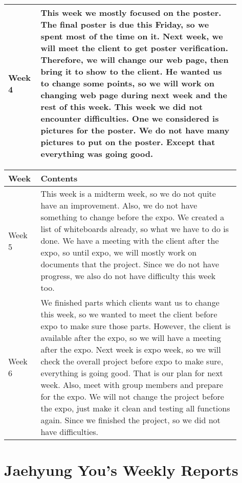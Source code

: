 \documentclass[10pt]{article}
\begin{document}
\begin{center}
\begin{tabular}{ | p{0.1\linewidth} | p{0.8\linewidth} | }
            Week 4 & This week we mostly focused on the poster. The final poster is due this Friday, so we spent most of the time on it. Next week, we will meet the client to get poster verification. Therefore, we will change our web page, then bring it to show to the client. He wanted us to change some points, so we will work on changing web page during next week and the rest of this week. This week we did not encounter difficulties. One we considered is pictures for the poster. We do not have many pictures to put on the poster. Except that everything was going good.  \\ \hline 
        \end{tabular}   
    
        \begin{tabular}{ | p{0.1\linewidth} | p{0.8\linewidth} | } \hline
            Week & Contents  \\ \hline                    
            Week 5 & This week is a midterm week, so we do not quite have an improvement. Also, we do not have something to change before the expo. We created a list of whiteboards already, so what we have to do is done. We have a meeting with the client after the expo, so until expo, we will mostly work on documents that the project.  Since we do not have progress, we also do not have difficulty this week too.   \\ \hline 
            Week 6 &  We finished parts which clients want us to change this week, so we wanted to meet the client before expo to make sure those parts. However, the client is available after the expo, so we will have a meeting after the expo. Next week is expo week, so we will check the overall project before expo to make sure, everything is going good. That is our plan for next week. Also, meet with group members and prepare for the expo. We will not change the project before the expo, just make it clean and testing all functions again. Since we finished the project, so we did not have difficulties.   \\ \hline 
        \end{tabular}
        \end{center}
        
\section{Jaehyung You's Weekly Reports}
\end{document}
